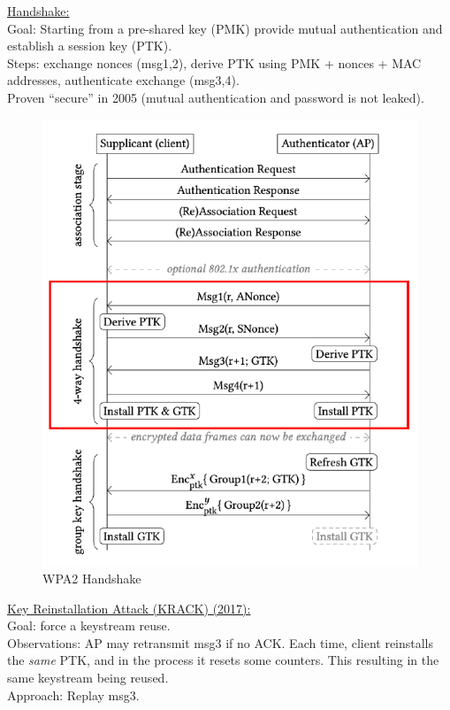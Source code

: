 \underline{Handshake:}\\
Goal: Starting from a pre-shared key (PMK) provide mutual authentication and establish a session key (PTK).
\\
Steps: exchange nonces (msg1,2), derive PTK using PMK + nonces + MAC addresses, authenticate exchange (msg3,4).
\\
Proven ``secure'' in 2005 (mutual authentication and password is not leaked).

\begin{figure}
	\centering
	\includegraphics[scale=0.6]{images/9-wpa2-handshake.png}
	\caption{WPA2 Handshake}
	\label{fig:wpa2-handshake}
\end{figure}

\href{https://www.krackattacks.com/}{\underline{Key Reinstallation Attack (KRACK)} (2017):} \\
Goal: force a keystream reuse.
\\
Observations: AP may retransmit msg3 if no ACK. Each time, client reinstalls the \textit{same} PTK, and in the process it resets some counters.
This resulting in the same keystream being reused.
\\
Approach: Replay msg3.

